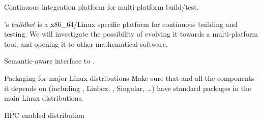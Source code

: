 \begin{workpackage}[id=component-architecture,wphases=0-48!.5,
  title=Component Architecture,lead=UV,
  PSRM=50,UVRM=8,SARM=16, USORM=6, UORM=4, LLRM=14, UJFRM=6, UGRM=14]
\begin{wpdelivs}
\begin{wpdeliv}[due=24,miles=proto1,id=portability-cygwin,dissem=PU,nature=OTHER,lead=PS]
    \end{wpdeliv}

    \begin{wpdeliv}[due=36,miles=community,id=multiplatform-buildbot,dissem=PP,nature=DEM,lead=UV]
      {Continuous integration platform for multi-platform build/test.}

      \Sage's \emph{buildbot} is a x86\_64/Linux specific platform for
      continuous building and testing. We will investigate the
      possibility of evolving it towards a multi-platform tool, and
      opening it to other mathematical software.
    \end{wpdeliv}%
    \begin{wpdeliv}[due=36,miles=community,id=semantic-interface-sage-gap,dissem=PU,nature=OTHER,lead=UO]
      {Semantic-aware \Sage interface to \GAP.}
    \end{wpdeliv}


    \begin{wpdeliv}[due=48,miles=eval,id=sage-distribution,dissem=PU,nature=OTHER,lead=UV]
      {Packaging for major Linux distributions} Make sure that \Sage and
      all the components it depends on (including \GAP,
      Linbox, \PariGP, Singular, \dots) have standard packages in the
      main Linux distributions.
    \end{wpdeliv}

    \begin{wpdeliv}[due=48,miles=eval,id=hpc-configure,dissem=PU,nature=OTHER,lead=UJF]
      {HPC enabled \Sage distribution}
    \end{wpdeliv}


\end{wpdelivs}
\end{workpackage}
